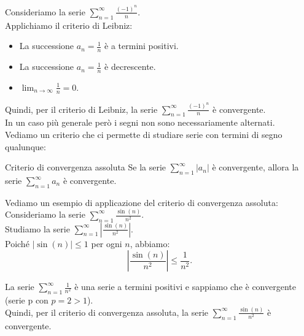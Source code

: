 Consideriamo la serie $\sum_{n=1}^{\infty} \frac{(-1)^n}{n}$.\\
Applichiamo il criterio di Leibniz:
\begin{itemize}
  \item La successione $a_n = \frac{1}{n}$ è a termini positivi.
  \item La successione $a_n = \frac{1}{n}$ è decrescente.
  \item $\lim_{n \to \infty} \frac{1}{n} = 0$.
\end{itemize}
Quindi, per il criterio di Leibniz, la serie $\sum_{n=1}^{\infty} \frac{(-1)^n}{n}$ è convergente.\\

In un caso più generale però i segni non sono necessariamente alternati.\\
Vediamo un criterio che ci permette di studiare serie con termini di segno qualunque:
\begin{teorema}{Criterio di convergenza assoluta}
  Se la serie $\sum_{n=1}^{\infty} |a_n|$ è convergente, allora la serie $\sum_{n=1}^{\infty} a_n$ è convergente.
\end{teorema}

Vediamo un esempio di applicazione del criterio di convergenza assoluta:\\

Consideriamo la serie $\sum_{n=1}^{\infty} \frac{\sin(n)}{n^2}$.\\
Studiamo la serie $\sum_{n=1}^{\infty} \left| \frac{\sin(n)}{n^2} \right|$.\\

Poiché $|\sin(n)| \leq 1$ per ogni $n$, abbiamo:
\[
\left| \frac{\sin(n)}{n^2} \right| \leq \frac{1}{n^2}.
\]

La serie $\sum_{n=1}^{\infty} \frac{1}{n^2}$ è una serie a termini positivi e sappiamo che è convergente (serie p con $p = 2 > 1$).\\

Quindi, per il criterio di convergenza assoluta, la serie $\sum_{n=1}^{\infty} \frac{\sin(n)}{n^2}$ è convergente.




